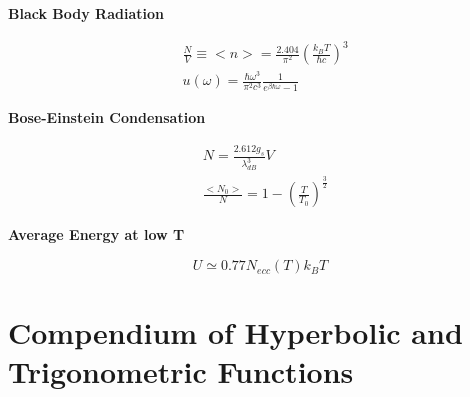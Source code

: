 \documentclass{article}
\begin{document}
\newpage
\begin{tcolorbox}[colframe=gray!90, colback=gray!5, coltitle=white, sharp corners, title=\textbf{Bose Gas, Summary}, fonttitle=\large\bfseries]
    \textbf{Black Body Radiation}

    \begin{equation}
        \begin{aligned}
             & \frac{N}{V}\equiv<n>=\frac{2.404}{\pi^2}\left(\frac{k_B T}{\hbar c}\right)^3 \\
             & u(\omega)=\frac{\hbar \omega^3}{\pi^2c^3}\frac{1}{e^{\beta\hbar\omega}-1}
        \end{aligned}
    \end{equation}

    \textbf{Bose-Einstein Condensation}

    \begin{equation}
        \begin{aligned}
             & N=\frac{2.612 g_s}{\lambda_{dB}^3}V                        \\
             & \frac{<N_0>}{N}=1-\left(\frac{T}{T_0}\right)^{\frac{3}{2}}
        \end{aligned}
    \end{equation}

    \textbf{Average Energy at low T}

    \begin{equation}
        U\simeq 0.77N_{ecc}(T)k_BT
    \end{equation}

\end{tcolorbox}
\newpage




\newpage



\section{Compendium of Hyperbolic and Trigonometric Functions}
\end{document}
